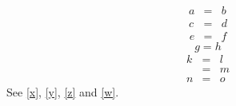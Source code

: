 \documentclass{article}
\begin{document}
\begin{eqnarray}
a &=& b \\
c &=& d \label{x}\nonumber
\end{eqnarray}
\begin{eqnarray*}
e &=& f \label{y}
\end{eqnarray*}
\begin{equation}
g = h
\end{equation}
\begin{eqnarray}
k &=& l \\
  &=& m \label{z}\nonumber \\
n &=& o \label{w}\nonumber
\end{eqnarray}
See \ref{x}, \ref{y}, \ref{z} and \ref{w}.
\end{document}
